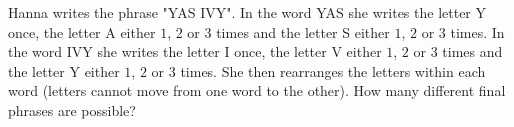Hanna writes the phrase "YAS IVY". In the word YAS she writes the letter Y once, the letter A either $1$, $2$ or $3$ times and the letter S either $1$, $2$ or $3$ times. In the word IVY she writes the letter I once, the letter V either $1$, $2$ or $3$ times and the letter Y either $1$, $2$ or $3$ times. She then rearranges the letters within each word (letters cannot move from one word to the other). How many different final phrases are possible?
